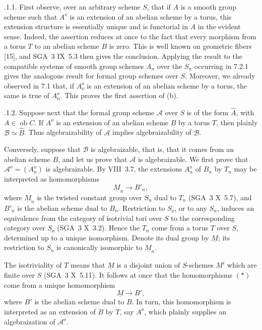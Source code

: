 \medskip
{}.1.1. First observe, over an arbitrary scheme $S$, that if $A$ is
a smooth group scheme such that $A^o$ is an extension of an abelian
scheme by a torus, this extension structure is essentially unique and
is functorial in $A$ in the evident sense.  Indeed, the assertion
reduces at once to the fact that every morphism from a torus $T$ to an
abelian scheme $B$ is zero.  This is well known on geometric fibers
[15], and SGA~3 IX~5.3 then gives the conclusion.  Applying the result
to the compatible systems of smooth group schemes $A_n$ over the
$S_n$ occurring in 7.2.1 gives the analogous result for formal group
schemes over $S$.  Moreover, we already observed in 7.1 that, if
$A_o^o$ is an extension of an abelian scheme by a torus, the same is
true of $A_n^o$.  This proves the first assertion of (b).

\medskip
{}.1.2. Suppose next that the formal group scheme $\mathcal A$ over
$S$ is of the form $\widehat A$, with $A\in\operatorname{ob}C$.  If
$A^o$ is an extension of an abelian scheme $B$ by a torus $T$, then
plainly $\mathcal B\simeq\widehat B$.  Thus algebraizability of
$\mathcal A$ implies algebraizability of $\mathcal B$.

Conversely, suppose that $\mathcal B$ is algebraizable, that is, that
it comes from an abelian scheme $B$, and let us prove that $\mathcal A$
is algebraizable.  We first prove that
$\mathcal A^o=(A_n^o)$ is algebraizable.  By VIII~3.7, the extensions
$A_n^o$ of $B_n$ by $T_n$ may be interpreted as homomorphisms
\begin{equation}\tag{*}
 \underline M_n\longrightarrow B'_n,
\end{equation}
where $\underline M_n$ is the twisted constant group over $S_n$ dual
to $T_n$ (SGA~3 X~5.7), and $B'_n$ is the abelian scheme dual to
$B_n$.  Restriction to $S_o$, or to any $S_n$, induces an equivalence
from the category of isotrivial tori over $S$ to the corresponding
category over $S_o$ (SGA~3 X~3.2).  Hence the $T_n$ come from a torus
$T$ over $S$, determined up to a unique isomorphism.  Denote its dual
group by $\underline M$; its restriction to $S_n$ is canonically
isomorphic to $\underline M_n$.

The isotriviality of $T$ means that $\underline M$ is a disjoint union
of $S$-schemes $\underline M^i$ which are finite over $S$
(SGA~3 X~5.11).  It follows at once that the homomorphisms $(*)$ come
from a unique homomorphism
\begin{equation}\tag{**}
 \underline M\longrightarrow B',
\end{equation}
where $B'$ is the abelian scheme dual to $B$.  In turn, this
homomorphism is interpreted as an extension of $B$ by $T$, say $A^o$,
which plainly supplies an algebraization of $\mathcal A^o$.


